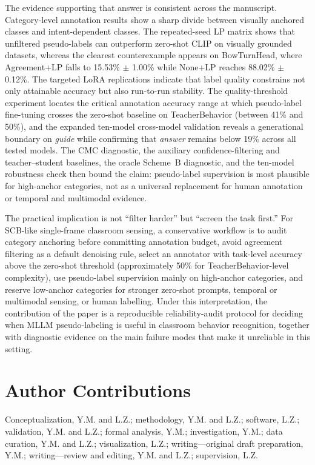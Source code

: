 \documentclass{ieeeaccess}
\begin{document}
The evidence supporting that answer is consistent across the
manuscript.
Category-level annotation results show a sharp divide between visually
anchored classes and intent-dependent classes.
The repeated-seed LP matrix shows that unfiltered pseudo-labels can
outperform zero-shot CLIP on visually grounded datasets, whereas the
clearest counterexample appears on BowTurnHead, where Agreement+LP
falls to 15.53\% $\pm$ 1.00\% while None+LP reaches 88.02\%
$\pm$ 0.12\%.
The targeted LoRA replications indicate that label quality constrains
not only attainable accuracy but also run-to-run stability.
The quality-threshold experiment locates the critical annotation accuracy
range at which pseudo-label fine-tuning crosses the zero-shot baseline on
TeacherBehavior (between 41\% and 50\%), and the expanded ten-model
cross-model validation reveals a generational boundary on
\textit{guide} while confirming that \textit{answer} remains below 19\%
across all tested models.
The CMC diagnostic, the auxiliary confidence-filtering and
teacher--student baselines, the oracle Scheme~B diagnostic, and the
ten-model robustness check then bound the claim: pseudo-label
supervision is most plausible for high-anchor categories, not as a
universal replacement for human annotation or temporal and multimodal
evidence.

The practical implication is not ``filter harder'' but
``screen the task first.''
For SCB-like single-frame classroom sensing, a conservative workflow is
to audit category anchoring before committing annotation budget,
avoid agreement filtering as a default denoising rule,
select an annotator with task-level accuracy above the zero-shot
threshold (approximately 50\% for TeacherBehavior-level complexity),
use pseudo-label supervision mainly on high-anchor categories,
and reserve low-anchor categories for stronger zero-shot prompts,
temporal or multimodal sensing, or human labelling.
Under this interpretation, the contribution of the paper is a
reproducible reliability-audit protocol for deciding when MLLM
pseudo-labeling is useful in classroom behavior recognition, together
with diagnostic evidence on the main failure modes that make it
unreliable in this setting.

\section*{Author Contributions}
Conceptualization, Y.M. and L.Z.; methodology, Y.M. and L.Z.; software,
L.Z.; validation, Y.M. and L.Z.; formal analysis, Y.M.; investigation,
Y.M.; data curation, Y.M. and L.Z.; visualization, L.Z.; writing---original
draft preparation, Y.M.; writing---review and editing, Y.M. and L.Z.;
supervision, L.Z.
\end{document}
